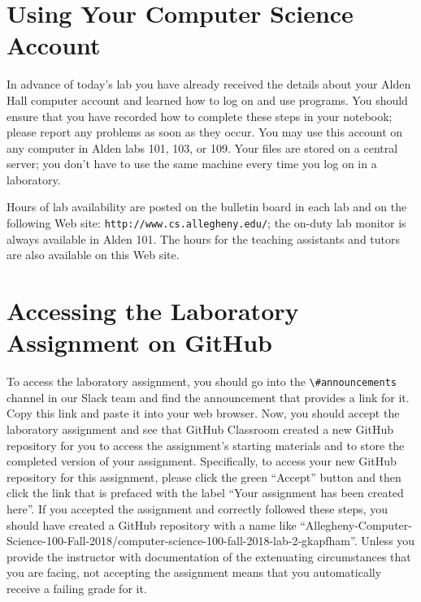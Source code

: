 \documentclass[11pt]{article}
\newcommand{\url}[1]{\lstinline{#1}}
\newcommand{\channel}[1]{\lstinline{#1}}
\begin{document}
\section*{Using Your Computer Science Account}

In advance of today's lab you have already received the details about your Alden
Hall computer account and learned how to log on and use programs. You should
ensure that you have recorded how to complete these steps in your notebook;
please report any problems as soon as they occur. You may use this account on
any computer in Alden labs 101, 103, or 109. Your files are stored on a central
server; you don't have to use the same machine every time you log on in a
laboratory.

Hours of lab availability are posted on the bulletin board in each lab and on
the following Web site: \url{http://www.cs.allegheny.edu/}; the on-duty lab
monitor is always available in Alden 101. The hours for the teaching assistants
and tutors are also available on this Web site.

\section*{Accessing the Laboratory Assignment on GitHub}

To access the laboratory assignment, you should go into the
\channel{\#announcements} channel in our Slack team and find the announcement
that provides a link for it. Copy this link and paste it into your web browser.
Now, you should accept the laboratory assignment and see that GitHub Classroom
created a new GitHub repository for you to access the assignment's starting
materials and to store the completed version of your assignment. Specifically,
to access your new GitHub repository for this assignment, please click the green
``Accept'' button and then click the link that is prefaced with the label ``Your
assignment has been created here''. If you accepted the assignment and correctly
followed these steps, you should have created a GitHub repository with a name
like
``Allegheny-Computer-Science-100-Fall-2018/computer-science-100-fall-2018-lab-2-gkapfham''.
Unless you provide the instructor with documentation of the extenuating
circumstances that you are facing, not accepting the assignment means that you
automatically receive a failing grade for it.
\end{document}
